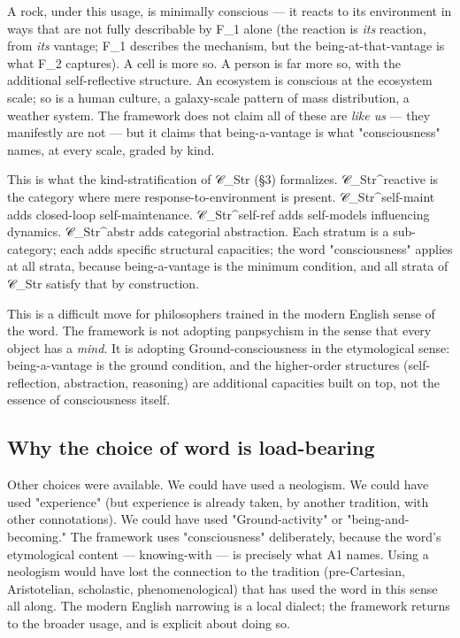 \documentclass[11pt, openany]{book}
\begin{document}
A rock, under this usage, is minimally conscious --- it reacts to its environment in ways that are not fully describable by F\_\allowbreak{}1 alone (the reaction is \textit{its} reaction, from \textit{its} vantage; F\_\allowbreak{}1 describes the mechanism, but the being-at-that-vantage is what F\_\allowbreak{}2 captures). A cell is more so. A person is far more so, with the additional self-reflective structure. An ecosystem is conscious at the ecosystem scale; so is a human culture, a galaxy-scale pattern of mass distribution, a weather system. The framework does not claim all of these are \textit{like us} --- they manifestly are not --- but it claims that being-a-vantage is what "consciousness" names, at every scale, graded by kind.

This is what the kind-stratification of 𝒞\_\allowbreak{}Str (§3) formalizes. 𝒞\_\allowbreak{}Str\textasciicircum{}reactive is the category where mere response-to-environment is present. 𝒞\_\allowbreak{}Str\textasciicircum{}self-maint adds closed-loop self-maintenance. 𝒞\_\allowbreak{}Str\textasciicircum{}self-ref adds self-models influencing dynamics. 𝒞\_\allowbreak{}Str\textasciicircum{}abstr adds categorial abstraction. Each stratum is a sub-category; each adds specific structural capacities; the word "consciousness" applies at all strata, because being-a-vantage is the minimum condition, and all strata of 𝒞\_\allowbreak{}Str satisfy that by construction.

This is a difficult move for philosophers trained in the modern English sense of the word. The framework is not adopting panpsychism in the sense that every object has a \textit{mind}. It is adopting Ground-consciousness in the etymological sense: being-a-vantage is the ground condition, and the higher-order structures (self-reflection, abstraction, reasoning) are additional capacities built on top, not the essence of consciousness itself.

\subsection{Why the choice of word is load-bearing}

Other choices were available. We could have used a neologism. We could have used "experience" (but experience is already taken, by another tradition, with other connotations). We could have used "Ground-activity" or "being-and-becoming." The framework uses "consciousness" deliberately, because the word's etymological content --- knowing-with --- is precisely what A1 names. Using a neologism would have lost the connection to the tradition (pre-Cartesian, Aristotelian, scholastic, phenomenological) that has used the word in this sense all along. The modern English narrowing is a local dialect; the framework returns to the broader usage, and is explicit about doing so.
\end{document}
